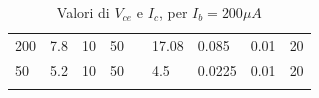 \documentclass{article}
\begin{document}
\begin{longtable}[c]{|l|l|l|l|l|l|l|l|l|}
    200           & 7.8                       & 10                        & 50                        &  & 17.08      & 0.085                     & 0.01                      & 20                        \\ \cline{1-4} \cline{6-9}
    50            & 5.2                       & 10                        & 50                        &  & 4.5        & 0.0225                    & 0.01                      & 20                        \\ \cline{1-4} \cline{6-9}
    \caption{\label{tab:Tabella1}{Valori di $V_{ce}$ e $I_c$, per $I_b=200\mu A$}}                                                                                                                        \\
\end{longtable}
\end{document}
